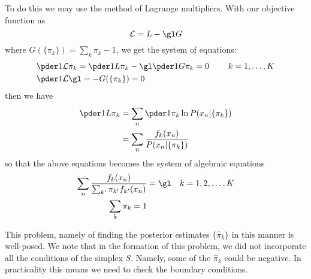 To do this we may use the method of Lagrange multipliers. With our objective function as 
\[\mathcal{L}=L-\gl G\]
where $G(\{\pi_k\})=\sum_k \pi_k -1$, we get the system of equations:
\begin{align*}
&\pder1{\mathcal{L}}{\pi_k}=\pder1{L}{\pi_k}-\gl \pder1{G}{\pi_k}=0\qquad \; k=1,\ldots, K\\
&\pder1{\mathcal{L}}{\gl}=-G(\{\pi_k\})=0
\end{align*}
then we have 
\begin{align*}
\pder1{L}{\pi_k}&=\sum_n \pder1{}{\pi_k}\ln P(x_n|\{\pi_k\})\\
&=\sum_n \frac{f_k(x_n)}{P(x_n|\{\pi_k\})}
\end{align*}
so that the above equations becomes the system of algebraic equations
\begin{align}\label{lageq}
\sum_n\frac{f_k(x_n)}{\sum_{k'}\pi_{k'}f_{k'}(x_n)}&=\gl&k=1,2,\ldots, K\\
\sum_k\pi_k=1
\end{align}

This problem, namely of finding the posterior estimates $\{\hat{\pi}_k\}$ in this manner is well-posed.  We note that in the formation of this problem, we did not incorporate all the conditions of the simplex $S$.  Namely, some of the $\hat{\pi}_k$ could be negative. In practicality this means we need to check the boundary conditions.


